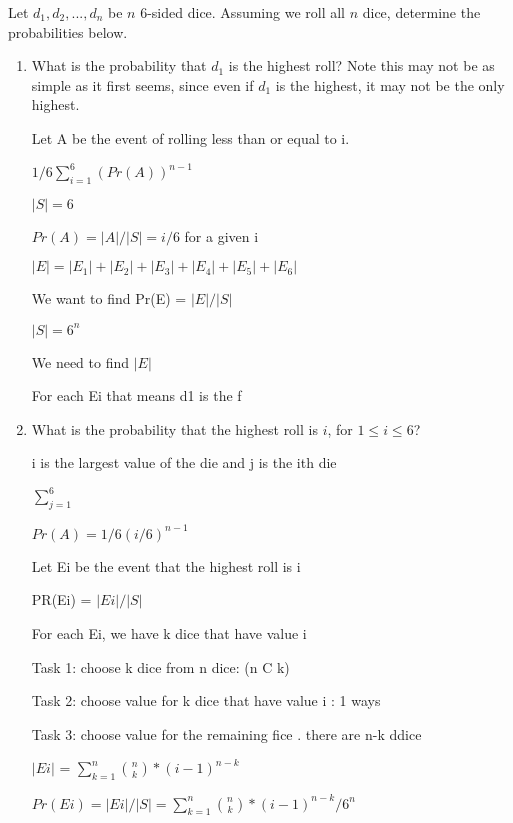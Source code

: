 \documentclass[12pt]{article}
\newcounter{ques}
\newenvironment{question}{\stepcounter{ques}{\noindent\bf Question \arabic{ques}:}}{\vspace{5mm}}
\begin{document}
\begin{question}
	Let ${d_1,d_2, ..., d_n}$ be $n$ $6$-sided dice. Assuming we roll all $n$ dice, determine the probabilities below.   
	\begin{enumerate}
		\item What is the probability that $d_1$ is the highest roll? Note this may not be as simple as it first seems, since even if $d_1$ is the highest, it may not be the only highest. 
		
		Let A be the event of rolling less than or equal to i.

		$1/6 \sum_{i=1}^{6} (Pr(A))^{n-1}$

		$|S| = 6$

		$Pr(A) = |A| / |S| = i/6$ for a given i




		$|E|= |E_1| + |E_2| + |E_3| + |E_4| + |E_5| + |E_6|$

		We want to find Pr(E) = $|E|/|S|$

		$|S| = 6^n$

		We need to find $|E|$

		For each Ei that means d1 is the f 


		\item What is the probability that the highest roll is $i$, for $1\leq i \leq 6$?
		
		i is the largest value of the die and j is the ith die

		$\sum_{j=1}^{6}$

		$Pr(A) = 1/6 (i/6)^{n-1}$

		Let Ei be the event that the highest roll is i

		PR(Ei) = $|Ei|/|S|$

		For each Ei, we have k dice that have value i

		Task 1: choose k dice from n dice: (n C k)

		Task 2: choose value for k dice that have value i : 1 ways

		Task 3: choose value for the remaining fice . there are n-k ddice

		$|Ei|$ = $\sum_{k = 1}^{n} {n \choose k}*(i-1)^{n-k}$

		$Pr(Ei) = |Ei| / |S| = \sum_{k = 1}^{n} {n \choose k}*(i-1)^{n-k} / 6^n$

	\end{enumerate}

\end{question}
\end{document}
